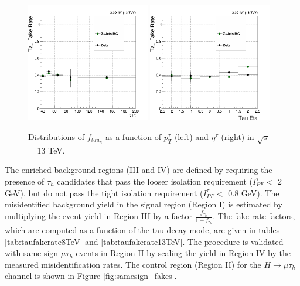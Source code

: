 \documentclass[oneside, letterpaper, oldfontcommands]{memoir}
\begin{document}
\begin{figure}[hbtp]\centering
\includegraphics[width=0.48\textwidth]{tightOldIso_looseOldIso_tPt_fakeRate_13TeV.png}
\includegraphics[width=0.48\textwidth]{tightOldIso_looseOldIso_tEta_fakeRate_13TeV.png}
\caption{Distributions of $f_{tau_{h}}$ as a function of $ p_{T}^{\tau}$ (left) and $\eta^{\tau}$ (right) in $\sqrt{s}$ = 13 TeV.}
\label{fig:taufakerate13TeV}\end{figure}


\qquad The enriched background regions (III and IV) are defined by requiring the presence of $\tau_{h}$ candidates that pass the looser isolation requirement ($I_{PF}^{\tau} <$ 2 GeV), but do not pass the tight isolation requirement ($I_{PF}^{\tau} <$ 0.8 GeV). The misidentified background yield in the signal region (Region I) is estimated by multiplying the event yield in Region III by a factor $\frac{f_{\tau_{h}}}{1-f_{\tau_{h}}}$. The fake rate factors, which are computed as a function of the tau decay mode, are given in tables \ref{tab:taufakerate8TeV} and \ref{tab:taufakerate13TeV}. The procedure is validated with same-sign $\mu\tau_{h}$ events in Region II by scaling the yield in Region IV by the measured misidentification rates. The control region (Region II) for the $H \rightarrow \mu\tau_{h}$ channel is shown in Figure \ref{fig:samesign_fakes}.
\end{document}
